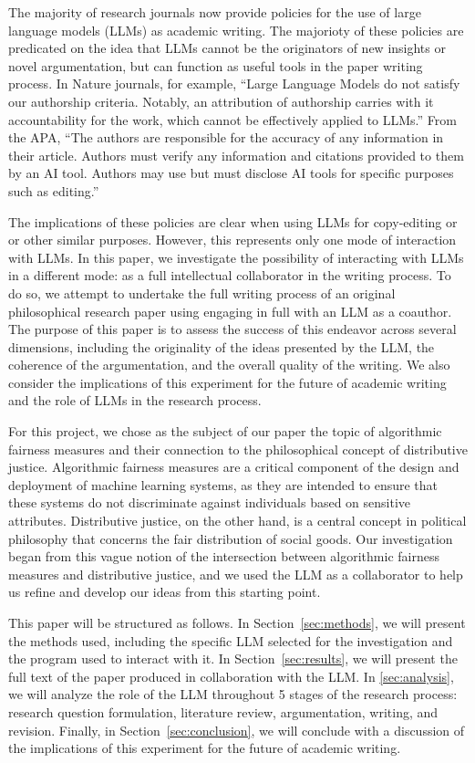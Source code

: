The majority of research journals now provide policies for the use of large
language models (LLMs) as academic writing. The majorioty of these policies are
predicated on the idea that LLMs cannot be the originators of new insights or
novel argumentation, but can function as useful tools in the paper writing
process. In Nature journals, for example, ``Large Language Models do not
satisfy our authorship criteria. Notably, an attribution of authorship carries 
with it accountability for the work, which cannot be effectively applied to
LLMs.'' From the APA, ``The authors are responsible for the accuracy of any
information in their article. Authors must verify any information and citations
provided to them by an AI tool. Authors may use but must disclose AI tools for
specific purposes such as editing.''

The implications of these policies are clear when using LLMs for copy-editing or
or other similar purposes. However, this represents only one mode of interaction
with LLMs. In this paper, we investigate the possibility of interacting with
LLMs in a different mode: as a full intellectual collaborator in the writing
process. To do so, we attempt to undertake the full writing process of an
original philosophical research paper using engaging in full with an LLM as a
coauthor. The purpose of this paper is to assess the success of this endeavor
across several dimensions, including the originality of the ideas presented by
the LLM, the coherence of the argumentation, and the overall quality of the
writing. We also consider the implications of this experiment for the future of
academic writing and the role of LLMs in the research process.

For this project, we chose as the subject of our paper the topic of algorithmic
fairness measures and their connection to the philosophical concept of
distributive justice. Algorithmic fairness measures are a critical component of
the design and deployment of machine learning systems, as they are intended to
ensure that these systems do not discriminate against individuals based on
sensitive attributes. Distributive justice, on the other hand, is a central
concept in political philosophy that concerns the fair distribution of social
goods. Our investigation began from this vague notion of the intersection
between algorithmic fairness measures and distributive justice, and we used the
LLM as a collaborator to help us refine and develop our ideas from this starting
point.

This paper will be structured as follows. In Section~\ref{sec:methods}, we will
present the methods used, including the specific LLM selected for the
investigation and the program used to interact with it. In
Section~\ref{sec:results}, we will present the full text of the paper produced
in collaboration with the LLM. In \ref{sec:analysis}, we will analyze the role
of the LLM throughout 5 stages of the research process: research question
formulation, literature review, argumentation, writing, and revision. Finally,
in Section~\ref{sec:conclusion}, we will conclude with a discussion of the
implications of this experiment for the future of academic writing.

